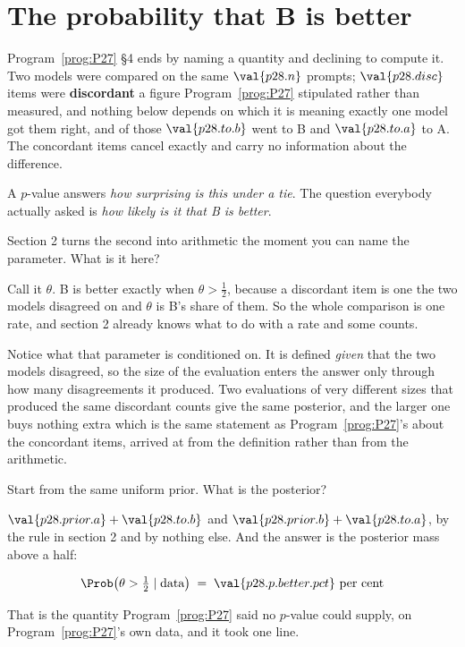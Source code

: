 \section{The probability that B is better}
\label{sec:P28-better}

\begin{fr}
Program~\ref{prog:P27} §4 ends by naming a quantity and declining to compute
it. Two models were compared on the same $\val{p28.n}$ prompts;
$\val{p28.disc}$ items were \textbf{discordant} \dash{} a figure
Program~\ref{prog:P27} stipulated rather than measured, and nothing below
depends on which it is \dash{} meaning exactly one model got them right, and
of those $\val{p28.to.b}$ went to B and $\val{p28.to.a}$ to A.
The concordant items cancel exactly and carry no information about the
difference.

A $p$-value answers \emph{how surprising is this under a tie}. The question
everybody actually asked is \emph{how likely is it that B is better}.

Section 2 turns the second into arithmetic the moment you can name the
parameter. What is it here?
\dotline
\nextframe
\end{fr}

\begin{fr}

Call it $\theta$. B is better exactly when $\theta > \frac{1}{2}$, because a
discordant item is one the two models disagreed on and $\theta$ is B's share
of them. So the whole comparison is one rate, and section 2 already knows what
to do with a rate and some counts.

Notice what that parameter is conditioned on. It is defined \emph{given} that
the two models disagreed, so the size of the evaluation enters the answer only
through how many disagreements it produced. Two evaluations of very different
sizes that produced the same discordant counts give the same posterior, and
the larger one buys nothing extra \dash{} which is the same statement as
Program~\ref{prog:P27}'s about the concordant items, arrived at from the
definition rather than from the arithmetic.

Start from the same uniform prior. What is the posterior?
\dotline
\nextframe
\end{fr}

\begin{fr}

$\val{p28.prior.a}+\val{p28.to.b}$ and
$\val{p28.prior.b}+\val{p28.to.a}$, by the rule in section 2 and by nothing
else. And the answer is the posterior mass above a half:

\[ \Prob\bigl(\theta > \tfrac{1}{2} \mid \text{data}\bigr)
   \;=\; \val{p28.p.better.pct}\ \text{per cent} \]


That is the quantity Program~\ref{prog:P27} said no $p$-value could supply, on
Program~\ref{prog:P27}'s own data, and it took one line.
\end{fr}

